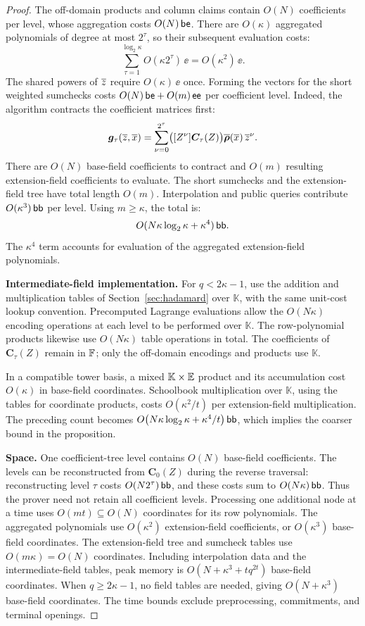\begin{proof}
The off-domain products and column claims contain \(O(N)\)
coefficients per level, whose aggregation costs \(O(N)\,\mathsf{be}\).
There are \(O(\kappa)\) aggregated polynomials of degree
at most \(2^\tau\), so their subsequent evaluation costs:
\[
    \sum_{\tau=1}^{\log_2\kappa}
        O(\kappa2^\tau)\,\ee
       =O(\kappa^2)\,\ee.
\]
The shared powers of \(\overline{z}\) require
\(O(\kappa)\,\ee\) once.
Forming the vectors for the short weighted sumchecks costs
\(O(N)\,\mathsf{be}+O(m)\,\mathsf{ee}\) per coefficient level.
Indeed, the algorithm contracts the coefficient matrices first:
\[
    \bm g_\tau(\overline{z},\overline{x})
       =\sum_{\nu=0}^{2^\tau}
          \bigl([Z^\nu]\bm C_\tau(Z)\bigr)
          \overline{\bm\rho}(\overline{x})\,\overline{z}^\nu.
\]
There are \(O(N)\) base-field coefficients to contract and
\(O(m)\) resulting extension-field coefficients to evaluate.
The short sumchecks and the extension-field tree have total
length \(O(m)\).
Interpolation and public queries contribute
\(O(\kappa^3)\,\mathsf{bb}\) per level.
Using \(m\geq\kappa\), the total is:
\[
    O(N\kappa\log_2\kappa+\kappa^4)\,\mathsf{bb}.
\]
The \(\kappa^4\) term accounts for evaluation of the
aggregated extension-field polynomials.

\smallskip\noindent\textbf{Intermediate-field implementation.}
For \(q<2\kappa-1\), use the addition and multiplication tables
of Section~\ref{sec:hadamard} over \(\mathbb K\), with the same
unit-cost lookup convention.
Precomputed Lagrange evaluations allow the
\(O(N\kappa)\) encoding operations at each level to be
performed over \(\mathbb K\).
The row-polynomial products likewise use
\(O(N\kappa)\) table operations in total.
The coefficients of \(\bm C_\tau(Z)\) remain in \({\mathbb{F}}\);
only the off-domain encodings and products use \(\mathbb K\).

In a compatible tower basis, a mixed
\(\mathbb K\times\mathbb{E}\) product and its
accumulation cost \(O(\kappa)\) in base-field coordinates.
Schoolbook multiplication over \(\mathbb K\), using the
tables for coordinate products, costs
\(O(\kappa^2/t)\) per extension-field multiplication.
The preceding count becomes
\(O\bigl(N\kappa\log_2\kappa+\kappa^4/t\bigr)\,\mathsf{bb}\),
which implies the coarser bound in the proposition.

\smallskip\noindent\textbf{Space.}
One coefficient-tree level contains \(O(N)\) base-field
coefficients. The levels can be reconstructed from
\(\bm C_0(Z)\) during the reverse traversal:
reconstructing level \(\tau\) costs \(O(N2^\tau)\,\mathsf{bb}\),
and these costs sum to \(O(N\kappa)\,\mathsf{bb}\).
Thus the prover need not retain all coefficient levels.
Processing one additional node at a time uses
\(O(mt)\subseteq O(N)\) coordinates for its row polynomials.
The aggregated polynomials use \(O(\kappa^2)\)
extension-field coefficients, or \(O(\kappa^3)\)
base-field coordinates. The extension-field tree and
sumcheck tables use \(O(m\kappa)=O(N)\) coordinates.
Including interpolation data and the intermediate-field
tables, peak memory is \(O(N+\kappa^3+tq^{2t})\)
base-field coordinates.
When \(q\geq2\kappa-1\), no field tables are needed, giving
\(O(N+\kappa^3)\) base-field coordinates.
The time bounds exclude preprocessing, commitments, and
terminal openings.
\end{proof}

